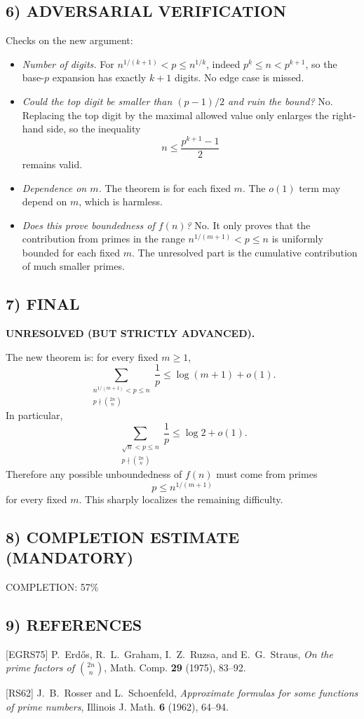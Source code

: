 \subsection*{6) ADVERSARIAL VERIFICATION}
Checks on the new argument:
\begin{itemize}
\item \emph{Number of digits.}  
For $n^{1/(k+1)}<p\le n^{1/k}$, indeed $p^k\le n<p^{k+1}$, so the base-$p$ expansion has exactly $k+1$ digits.  No edge case is missed.

\item \emph{Could the top digit be smaller than $(p-1)/2$ and ruin the bound?}  
No.  Replacing the top digit by the maximal allowed value only enlarges the right-hand side, so the inequality
\[
n\le \frac{p^{k+1}-1}{2}
\]
remains valid.

\item \emph{Dependence on $m$.}  
The theorem is for each fixed $m$.  The $o(1)$ term may depend on $m$, which is harmless.

\item \emph{Does this prove boundedness of $f(n)$?}  
No.  It only proves that the contribution from primes in the range $n^{1/(m+1)}<p\le n$ is uniformly bounded for each fixed $m$.  The unresolved part is the cumulative contribution of much smaller primes.
\end{itemize}

\subsection*{7) FINAL}
\textbf{UNRESOLVED (BUT STRICTLY ADVANCED).}

The new theorem is:
for every fixed $m\ge 1$,
\[
\sum_{\substack{n^{1/(m+1)}<p\le n\\ p\nmid \binom{2n}{n}}}\frac1p
\le \log(m+1)+o(1).
\]
In particular,
\[
\sum_{\substack{\sqrt{n}<p\le n\\ p\nmid \binom{2n}{n}}}\frac1p
\le \log 2+o(1).
\]
Therefore any possible unboundedness of $f(n)$ must come from primes
\[
p\le n^{1/(m+1)}
\]
for every fixed $m$.
This sharply localizes the remaining difficulty.

\subsection*{8) COMPLETION ESTIMATE (MANDATORY)}
COMPLETION: 57\%

\subsection*{9) REFERENCES}
[EGRS75] P.~Erd\H{o}s, R.~L.~Graham, I.~Z.~Ruzsa, and E.~G.~Straus, \emph{On the prime factors of $\binom{2n}{n}$}, Math. Comp. \textbf{29} (1975), 83--92.

[RS62] J.~B.~Rosser and L.~Schoenfeld, \emph{Approximate formulas for some functions of prime numbers}, Illinois J. Math. \textbf{6} (1962), 64--94.
